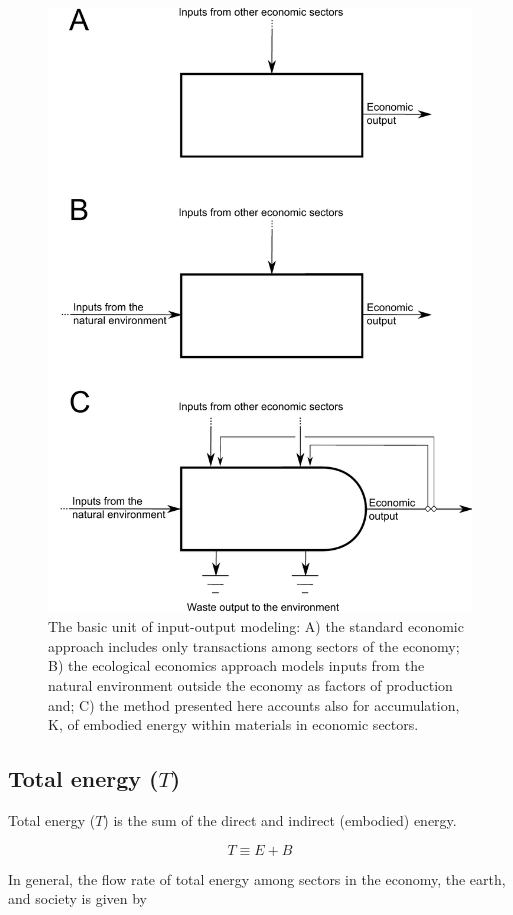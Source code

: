 \documentclass[authoryear,preprint,review,12pt]{elsarticle}
\begin{document}
\begin{figure}[H]
\includegraphics[width=0.8\linewidth]{images/Basic_unit_v3.pdf}
\caption{The basic unit of input-output modeling: A) the standard economic approach includes only transactions among sectors of the economy; B) the ecological economics approach models inputs from the natural environment outside the economy as factors of production and; C) the method presented here accounts also for accumulation, K, of embodied energy within materials in economic sectors.}
\label{fig:basic_unit}
\end{figure}

\subsection{Total energy ($T$)}

Total energy ($T$) is the sum of the direct and indirect (embodied) energy.

\begin{equation} \label{eq:T_def}
	T \equiv E + B
\end{equation}

In general, the flow rate of total energy among sectors in the economy, the earth, and society is given by
\end{document}
